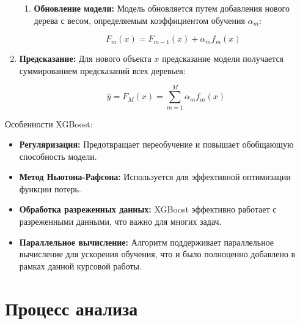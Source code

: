 \documentclass[14pt, a4paper]{../cls/coursework}
\begin{document}
\begin{enumerate}[label=\arabic*.]
\begin{enumerate}[label=\roman*.]
            \item \textbf{Обновление модели:} Модель обновляется путем добавления нового дерева с весом, определяемым коэффициентом обучения $\alpha_m$:

            \[F_m(x) = F_{m-1}(x) + \alpha_m f_m(x)\]
        \end{enumerate}

        \item \textbf{Предсказание:}
        Для нового объекта $x$ предсказание модели получается суммированием предсказаний всех деревьев:

        \[\hat{y} = F_M(x) = \sum_{m=1}^M \alpha_m f_m(x)\]
    \end{enumerate}

    Особенности XGBoost:

    \begin{itemize}
        \item \textbf{Регуляризация:} Предотвращает переобучение и повышает обобщающую способность модели.
        \item \textbf{Метод Ньютона-Рафсона:} Используется для эффективной оптимизации функции потерь.
        \item \textbf{Обработка разреженных данных:} XGBoost эффективно работает с разреженными данными, что важно для многих задач.
        \item \textbf{Параллельное вычисление:} Алгоритм поддерживает параллельное вычисление для ускорения обучения, что и было полноценно добавлено в рамках данной курсовой работы.
    \end{itemize}

    \section{Процесс анализа}
\end{document}
